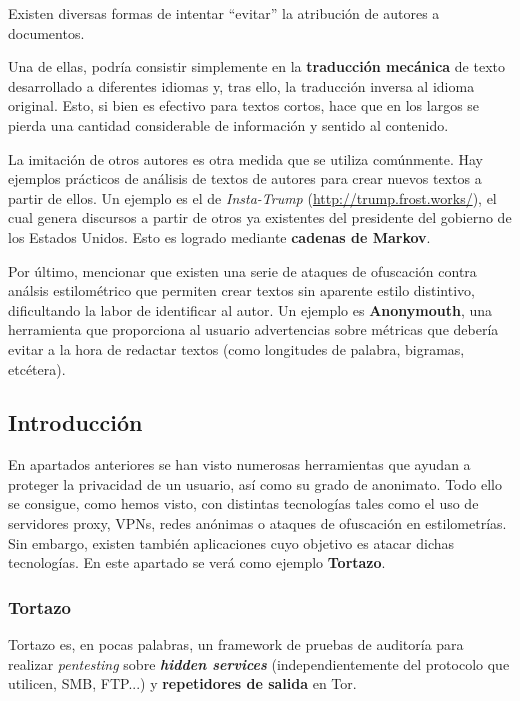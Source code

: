 Existen diversas formas de intentar ``evitar'' la atribución de autores a documentos. 

Una de ellas, podría consistir simplemente en la \textbf{traducción mecánica} de texto desarrollado a diferentes idiomas y, tras ello, la traducción inversa al idioma original. Esto, si bien es efectivo para textos cortos, hace que en los largos se pierda una cantidad considerable de información y sentido al contenido.

La imitación de otros autores es otra medida que se utiliza comúnmente. Hay ejemplos prácticos de análisis de textos de autores para crear nuevos textos a partir de ellos. Un ejemplo es el de \textit{Insta-Trump} (\url{http://trump.frost.works/}), el cual genera discursos a partir de otros ya existentes del presidente del gobierno de los Estados Unidos. Esto es logrado mediante \textbf{cadenas de Markov}.

Por último, mencionar que existen una serie de ataques de ofuscación contra análsis estilométrico que permiten crear textos sin aparente estilo distintivo, dificultando la labor de identificar al autor.
Un ejemplo es \textbf{Anonymouth}, una herramienta que proporciona al usuario advertencias sobre métricas que debería evitar a la hora de redactar textos (como longitudes de palabra, bigramas, etcétera).

 \label{sec:identificacion}
\subsection{Introducción}

En apartados anteriores se han visto numerosas herramientas que ayudan a proteger la privacidad de un usuario, así como su grado de anonimato. Todo ello se consigue, como hemos visto, con distintas tecnologías tales como el uso de servidores proxy, VPNs, redes anónimas o ataques de ofuscación en estilometrías. 
Sin embargo, existen también aplicaciones cuyo objetivo es atacar dichas tecnologías. En este apartado se verá como ejemplo \textbf{Tortazo}.

\subsubsection{Tortazo}
Tortazo es, en pocas palabras, un framework de pruebas de auditoría para realizar \textit{pentesting} sobre \textit{\textbf{hidden services}} (independientemente del protocolo que utilicen, SMB, FTP...) y \textbf{repetidores de salida} en Tor.

